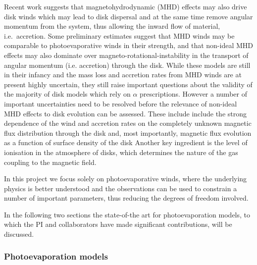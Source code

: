 \documentclass[10pt,fleqn,twoside]{article}
\begin{document}
Recent work suggests that magnetohydrodynamic (MHD) effects may also
drive disk winds 
\citep[e.g.,][]{2013ApJ...769...76B}
which may lead to disk
dispersal and at the same time remove angular momentum from the
system, thus allowing the inward flow of material, i.e.\ accretion. 
Some preliminary estimates suggest that MHD winds may be 
comparable to photoevaporative winds in their strength, and that
non-ideal MHD effects may also dominate over
magneto-rotational-instability  \citep[MRI, ]{1991ApJ...376..214B} in the transport of
angular momentum (i.e. accretion) through the disk. 
While these models are still in their infancy and the
mass loss and accretion rates from MHD winds are at present highly
uncertain, they still raise important questions about the validity of
the majority of 
disk models which rely on $\alpha$ prescriptions. However a number of
important uncertainties need to be resolved before the relevance of
non-ideal MHD effects to disk evolution can be assessed. These include
include the strong dependence of the wind and
accretion rates on the completely unknown magnetic flux distribution
through the disk and, most importantly, magnetic flux evolution as a
function of surface density of the disk 
\citep[e.g.\ discussion in][]{2013ApJ...778L..14A} 
Another key ingredient is the level of ionisation in the
atmosphere of disks, which determines the nature of the gas coupling to
the magnetic field. 

In this project we focus solely on photoevaporative winds, where the
underlying physics is better understood and the observations can be
used to constrain a number of important parameters, thus reducing the
degrees of freedom involved. 

In the following two sections the state-of-the art for photoevaporation
models, to which the PI and collaborators have made significant contributions, will be discussed.
 
\subsubsection{Photoevaporation models} 
\end{document}
